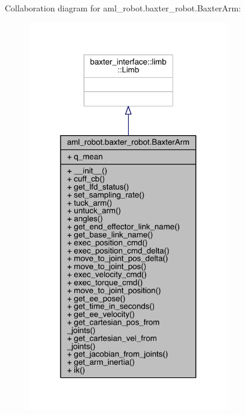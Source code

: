 Collaboration diagram for aml\+\_\+robot.\+baxter\+\_\+robot.\+Baxter\+Arm\+:
\nopagebreak
\begin{figure}[H]
\begin{center}
\leavevmode
\includegraphics[width=249pt]{classaml__robot_1_1baxter__robot_1_1_baxter_arm__coll__graph}
\end{center}
\end{figure}
